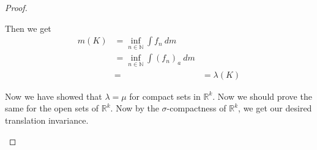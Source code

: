 \begin{proof}
\begin{enumerate}[label=(\arabic*)]
    Then we get
    \begin{align*}
      m(K) &= \inf_{n \in \mathbb{N}} \int  f_n \ dm \\
      & = \inf_{n \in \mathbb{N}} \int  (f_n)_a \ dm \\
      & =
      & = \lambda(K)
    \end{align*}

    Now we have showed that $ \lambda = \mu$ for compact sets in $
    \mathbb{R}^k$. Now we should prove the same for the open sets of
    $\mathbb{R}^k$. Now by the $\sigma$-compactness of
    $\mathbb{R}^k$, we get our desired translation invariance.

\end{enumerate}
\end{proof}



